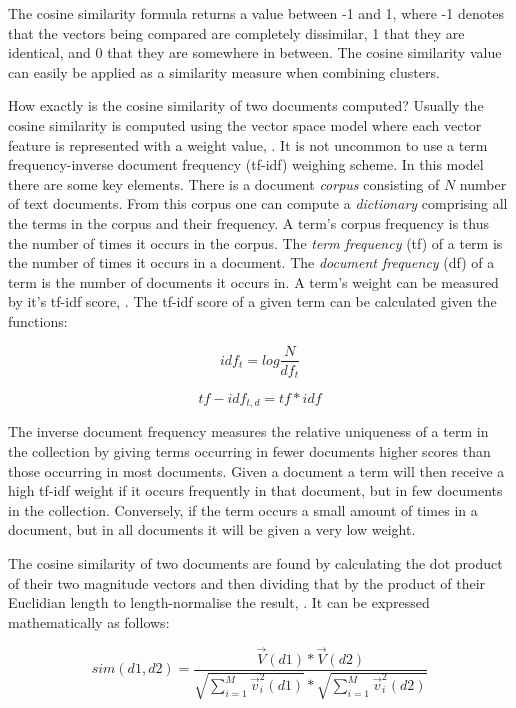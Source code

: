 The cosine similarity formula returns a value between -1 and 1, where -1 denotes that the vectors being compared are completely dissimilar, 1 that they are identical, and 0 that they are somewhere in between. The cosine similarity value can easily be applied as a similarity measure when combining clusters.

How exactly is the cosine similarity of two documents computed? Usually the cosine similarity is computed using the vector space model where each vector feature is represented with a weight value, \parencite{Manning2009a}. It is not uncommon to use a term frequency-inverse document frequency (tf-idf) weighing scheme. In this model there are some key elements. There is a document \textit{corpus} consisting of \(N\) number of text documents. From this corpus one can compute a \textit{dictionary} comprising all the terms in the corpus and their frequency. A term's corpus frequency is thus the number of times it occurs in the corpus. The \textit{term frequency} (tf) of a term is the number of times it occurs in a document. The \textit{document frequency} (df) of a term is the number of documents it occurs in. A term's weight can be measured by it's tf-idf score, \parencite{Manning2009a}. The tf-idf score of a given term can be calculated given the functions:


\begin{displaymath}
idf_{t} = log \frac{N}{df_{t}} 
\end{displaymath}

\begin{displaymath}
tf-idf_{t,d} = tf * idf
\end{displaymath}

The inverse document frequency measures the relative uniqueness of a term in the collection by giving terms occurring in fewer documents higher scores than those occurring in most documents. Given a document a term will then receive a high tf-idf weight if it occurs frequently in that document, but in few documents in the collection. Conversely, if the term occurs a small amount of times in a document, but in all documents it will be given a very low weight.

The cosine similarity of two documents are found by calculating the dot product of their two magnitude vectors and then dividing that by the product of their Euclidian length to length-normalise the result, \parencite{Manning2009a}. It can be expressed mathematically as follows:

\begin{displaymath}
sim(d1, d2) = \frac{\vec{V}(d1) * \vec{V}(d2)}
{\sqrt{\sum_{i = 1}^M\vec{v}_{i}^2(d1)} * \sqrt{\sum_{i = 1}^M\vec{v}_{i}^2(d2)}}
\end{displaymath}

